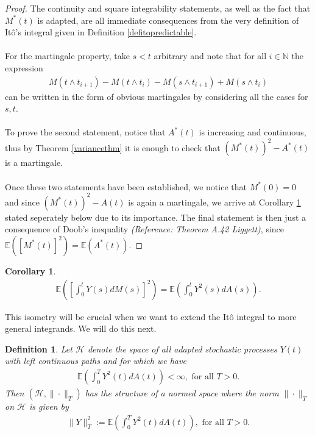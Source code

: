 \documentclass[11pt,a4paper, final]{article}
\newtheorem{cor}{Corollary}[thm]
\newtheorem{defn}{Definition}[section]
\begin{document}
\begin{proof}
The continuity and square integrability statements, as well as the fact that $M^*(t)$ is adapted, are all immediate consequences from the very definition of Itô's integral given in Definition \ref{defitopredictable}.
\\\\
For the martingale property, take $s < t$ arbitrary and note that for all $i \in \mathbb{N}$ the expression
\begin{align*}
M(t \wedge t_{i+1}) - M(t \wedge t_i) - M (s \wedge t_{i+1}) + M( s \wedge t_i)
\end{align*}
can be written in the form of obvious martingales by considering all the cases for $s,t$. 
\\\\
To prove the second statement, notice that $A^*(t)$ is increasing and continuous, thus by Theorem \ref{variancethm} it is enough to check that $(M^*(t))^2 - A^*(t)$ is a martingale. 
\\\\
Once these two statements have been established, we notice that $M^*(0)=0$ and since $(M^*(t))^2-A(t)$ is again a martingale, we arrive at Corollary \ref{corisometry} stated seperately below due to its importance. The final statement is then just a consequence of Doob's inequality \textit{(Reference: Theorem A.42 Liggett)}, since $ \mathbb{E}([M^*(t)]^2) = \mathbb{E}(A^*(t))$. 
\end{proof}
\begin{cor} \label{corisometry} \begin{align*}
\mathbb{E} \left( \left[ \int_0^t Y(s) dM(s) \right]^2\right) = \mathbb{E} \left( \int_0^t Y^2(s) dA(s) \right).
\end{align*}
\end{cor}
\noindent This isometry will be crucial when we want to extend the Itô integral to more general integrands. We will do this next.
\newpage
\begin{defn} Let $\mathcal{H}$ denote the space of all adapted stochastic processes $Y(t)$ with left continuous paths and for which we have
\begin{align*}
\mathbb{E} \left( \int_0^T Y^2(t) dA(t) \right) < \infty, \text{ for all } T >0.
\end{align*}
Then $( \mathcal{H}, \| \cdot \|_T )$ has the structure of a normed space where the norm $\| \cdot \|_T$ on $\mathcal{H}$ is given by 
\begin{align*}
\| Y\|_T^2 := \mathbb{E} \left( \int_0^T Y^2(t) dA(t) \right), \text{ for all } T >0.
\end{align*}
\end{defn}
\end{document}
